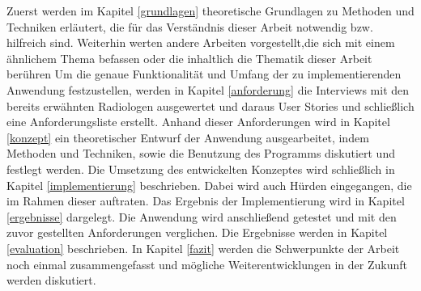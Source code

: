 Zuerst werden im  Kapitel \ref{grundlagen} theoretische Grundlagen zu Methoden und Techniken erläutert, die für das Verständnis dieser Arbeit notwendig bzw. hilfreich sind. Weiterhin werten andere Arbeiten vorgestellt,die sich mit einem ähnlichem Thema befassen oder die inhaltlich die Thematik dieser Arbeit berühren
Um die genaue Funktionalität und Umfang der zu implementierenden Anwendung festzustellen, werden in Kapitel \ref{anforderung} die Interviews mit den bereits erwähnten Radiologen ausgewertet und daraus User Stories und schließlich eine Anforderungsliste erstellt.
Anhand dieser Anforderungen wird in Kapitel \ref{konzept} ein theoretischer Entwurf der Anwendung ausgearbeitet, indem Methoden und Techniken, sowie die Benutzung des Programms diskutiert und festlegt werden.
Die Umsetzung des entwickelten Konzeptes wird schließlich in Kapitel \ref{implementierung} beschrieben. Dabei wird auch Hürden eingegangen, die im Rahmen dieser auftraten.
Das Ergebnis der Implementierung wird in Kapitel \ref{ergebnisse} dargelegt.
Die Anwendung wird anschließend getestet und mit den zuvor gestellten Anforderungen verglichen. Die Ergebnisse werden in Kapitel \ref{evaluation} beschrieben. 
In Kapitel \ref{fazit} werden die Schwerpunkte der Arbeit noch einmal zusammengefasst und mögliche Weiterentwicklungen in der Zukunft werden diskutiert. 
 